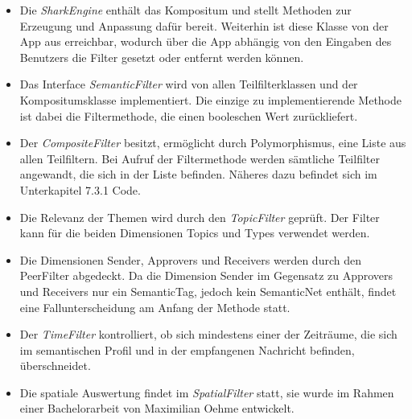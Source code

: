 \begin{itemize}
	\item Die \textit{SharkEngine} enthält das Kompositum und stellt Methoden zur Erzeugung und Anpassung dafür bereit. Weiterhin ist diese Klasse von der App aus erreichbar, wodurch über die App abhängig von den Eingaben des Benutzers die Filter gesetzt oder entfernt werden können.
	\item Das Interface \textit{SemanticFilter} wird von allen Teilfilterklassen und der Kompositumsklasse implementiert. Die einzige zu implementierende Methode ist dabei die Filtermethode, die einen booleschen Wert zurückliefert.
	\item Der \textit{CompositeFilter} besitzt, ermöglicht durch Polymorphismus, eine Liste aus allen Teilfiltern. Bei Aufruf der Filtermethode werden sämtliche Teilfilter angewandt, die sich in der Liste befinden. Näheres dazu befindet sich im Unterkapitel 7.3.1 Code. \\
	\item Die Relevanz der Themen wird durch den \textit{TopicFilter} geprüft. Der Filter kann für die beiden Dimensionen Topics und Types verwendet werden.
	\item Die Dimensionen Sender, Approvers und Receivers werden durch den PeerFilter abgedeckt. Da die Dimension Sender im Gegensatz zu Approvers und Receivers nur ein SemanticTag, jedoch kein SemanticNet enthält, findet eine Fallunterscheidung am Anfang der Methode statt.
	\item Der \textit{TimeFilter} kontrolliert, ob sich mindestens einer der Zeiträume, die sich im semantischen Profil und in der empfangenen Nachricht befinden, überschneidet. 
	\item Die spatiale Auswertung findet im \textit{SpatialFilter} statt, sie wurde im Rahmen einer Bachelorarbeit von Maximilian Oehme entwickelt.
\end{itemize}

